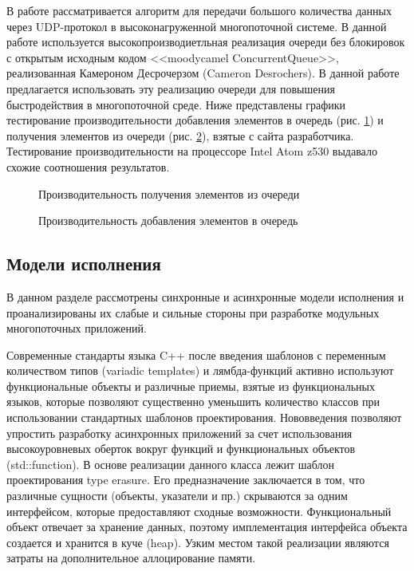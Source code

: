 В работе \cite{syzovalgorithm} рассматривается алгоритм для 
передачи большого количества данных через UDP-протокол в 
высоконагруженной многопоточной системе. В данной работе 
используется высокопроизводиетльная реализация очереди без 
блокировок с открытым исходным кодом <<moodycamel 
ConcurrentQueue>>, реализованная Камероном Десрочерзом 
(Cameron Desrochers). В данной работе предлагается использовать 
эту реализацию очереди для повышения быстродействия в 
многопоточной среде. Ниже представлены графики тестирование 
производительности добавления элементов в очередь (рис. 
\ref{im:2_1_2_dequeue}) и получения элементов из очереди (рис. 
\ref{im:2_1_3_enqueue}), взятые с сайта разработчика. 
Тестирование производительности на процессоре Intel Atom z530 
выдавало схожие соотношения результатов.

\begin{figure}[!htbp]
    \caption{Производительность получения элементов из очереди}
    \label{im:2_1_2_dequeue}
\end{figure}

\begin{figure}[!htbp]
    \caption{Производительность добавления элементов в очередь}
    \label{im:2_1_3_enqueue}
\end{figure}

\subsection{Модели исполнения}

В данном разделе рассмотрены синхронные и асинхронные модели 
исполнения и проанализированы их слабые и сильные стороны при 
разработке модульных многопоточных приложений.

Современные стандарты языка C++ после введения шаблонов с 
переменным количеством типов (variadic templates) и 
лямбда-функций активно используют функциональные объекты и 
различные приемы, взятые из функциональных языков, которые 
позволяют существенно уменьшить количество классов при 
использовании стандартных шаблонов проектирования. Нововведения 
позволяют упростить разработку асинхронных приложений за счет 
использования высокоуровневых оберток вокруг функций и 
функциональных объектов (std::function). В основе реализации 
данного класса лежит шаблон проектирования type erasure. Его 
предназначение заключается в том, что различные сущности 
(объекты, указатели и пр.) скрываются за одним интерфейсом, 
которые предоставляют сходные возможности. Функциональный объект 
отвечает за хранение данных, поэтому имплементация интерфейса 
объекта создается и хранится в куче (heap). Узким местом такой 
реализации являются затраты на дополнительное аллоцирование 
памяти.

